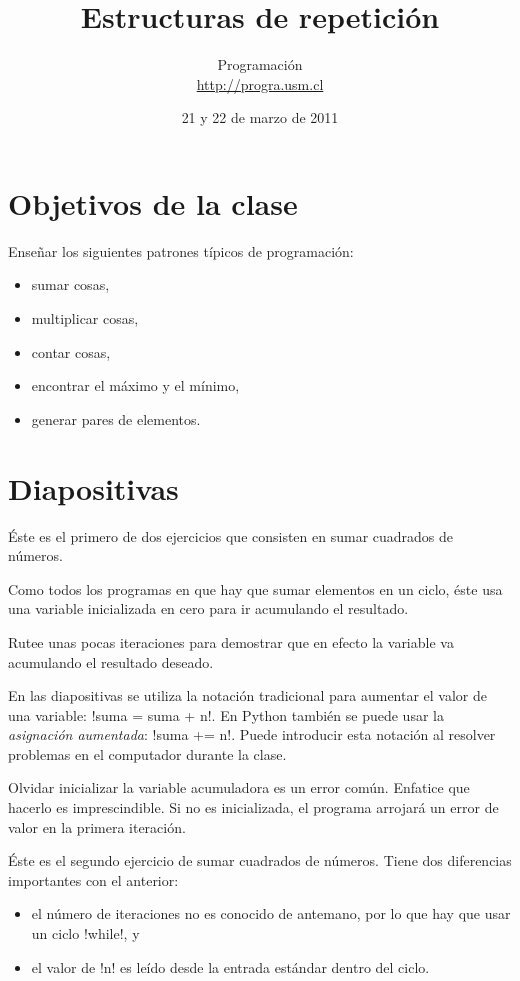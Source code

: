 \documentclass[10pt]{article}
\title{Estructuras de repetición}
\author{Programación \\ \url{http://progra.usm.cl}}
\date{21 y 22 de marzo de 2011}
\begin{document}
  \maketitle

  \section*{Objetivos de la clase}
  Enseñar los siguientes patrones típicos de programación:
  \begin{itemize}
    \item sumar cosas,
    \item multiplicar cosas,
    \item contar cosas,
    \item encontrar el máximo y el mínimo,
    \item generar pares de elementos.
  \end{itemize}

  \section*{Diapositivas}


  Éste es el primero de dos ejercicios
  que consisten en sumar cuadrados de números.

  Como todos los programas en que hay que sumar elementos en un ciclo,
  éste usa una variable inicializada en cero para ir acumulando el resultado.

  Rutee unas pocas iteraciones para demostrar que en efecto
  la variable va acumulando el resultado deseado.

  En las diapositivas se utiliza la notación tradicional
  para aumentar el valor de una variable:
  \li!suma = suma + n!.
  En Python también se puede usar la \emph{asignación aumentada}:
  \li!suma += n!.
  Puede introducir esta notación al resolver problemas en el computador durante la clase.

  Olvidar inicializar la variable acumuladora es un error común.
  Enfatice que hacerlo es imprescindible.
  Si no es inicializada, el programa arrojará un error de valor en la primera iteración.


  Éste es el segundo ejercicio de sumar cuadrados de números.
  Tiene dos diferencias importantes con el anterior:
  \begin{itemize}
    \item el número de iteraciones no es conocido de antemano,
      por lo que hay que usar un ciclo \li!while!, y
    \item el valor de \li!n! es leído desde la entrada estándar
      dentro del ciclo.
  \end{itemize}
  
\end{document}
